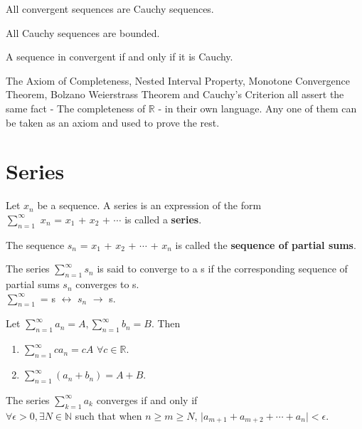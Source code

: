 \documentclass{report}
\begin{document}
\begin{theorem}
All convergent sequences are Cauchy sequences.
\end{theorem}

\begin{theorem}
All Cauchy sequences are bounded.
\end{theorem}

\begin{theorem}
A sequence in convergent if and only if it is Cauchy.
\end{theorem}
The Axiom of Completeness, Nested Interval Property, Monotone Convergence Theorem, Bolzano Weierstrass Theorem and Cauchy's Criterion all assert the same fact - The completeness of $\mathbb{R}$ - in their own language. Any one of them can be taken as an axiom and used to prove the rest.

\section{Series}
\begin{definition}
Let $x_n$ be a sequence. A series is an expression of the form \\ 
$\sum_{n=1}^{\infty}$ $x_n$ = $x_1$ + $x_2$ + $\cdots$ is called a \textbf{series}.
\end{definition}

\begin{definition}
The sequence $s_n$ = $x_1$ + $x_2$ + $\cdots$ + $x_n$ is called the \textbf{sequence of partial sums}.
\end{definition}
The series $\sum_{n=1}^{\infty}s_n$ is said to converge to a s if the corresponding sequence of partial sums $s_n$ converges to s.\\
$\sum_{n=1}^{\infty}$ = s $\leftrightarrow$  $s_n$ $\rightarrow$ s.

\begin{theorem}
Let $\sum_{n=1}^{\infty}a_n = A,\sum_{n=1}^{\infty}b_n = B$. Then 
\begin{enumerate}
\item $\sum_{n=1}^{\infty}ca_n = cA$ $\forall c \in \mathbb{R}$.
\item $\sum_{n=1}^{\infty}(a_n + b_n) = A + B$.
\end{enumerate} 
\end{theorem}

\begin{theorem}
The series $\sum_{k=1}^{\infty}a_k$ converges if and only if  \\ $\forall \epsilon > 0, \exists N \in \mathbb{N}$ such that when $n \geq m \geq N$, $\lvert a_{m+1} + a_{m+2} + \cdots + a_n\rvert < \epsilon$.
\end{theorem}
\end{document}
